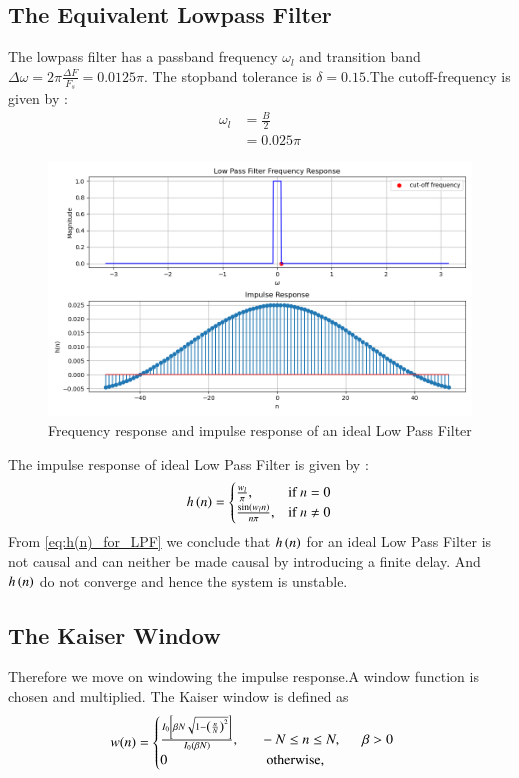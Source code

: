 \documentclass{article}
\begin{document}
\subsection{The Equivalent Lowpass Filter}
The lowpass filter has a passband frequency $\omega_l$ and transition band $\Delta \omega = 2\pi \frac{\Delta F}{F_s} = 0.0125\pi$.
The stopband tolerance is $\delta=0.15$.The cutoff-frequency is given by :
\begin{align}
    \omega_{l} &= \frac{B}{2}\\
                &= 0.025\pi
\end{align}
\begin{figure}[H]
\centering
\includegraphics[width=1\columnwidth]{figs/LPF_FIR.png}
\caption{Frequency response and impulse response of an ideal Low Pass Filter}
\label{fig:LPF_FIR_1}
\end{figure}

The impulse response of ideal Low Pass Filter is given by :
\begin{align}
    h\left(n\right) = 
\begin{cases} 
    \frac{w_l}{\pi}, & \text{if } n = 0 \\
    \frac{\sin(w_l n)}{n\pi}, & \text{if } n \neq 0
\end{cases} \label{eq:h(n)_for_LPF}
\end{align}
From \eqref{eq:h(n)_for_LPF} we conclude that $h\left(n\right)$ for an ideal Low Pass Filter is not causal and can neither be made causal by introducing a finite delay. And $h\left(n\right)$ do not converge and hence the system is unstable.
\subsection{The Kaiser Window}
Therefore we move on windowing the impulse response.A window function is chosen and multiplied. The Kaiser window is defined as
\begin{align}
    w(n) =
    \begin{cases}
    \frac{I_0\left[ \beta N \sqrt{1 - \left(\frac{n}{N}\right)^2} \right]}{I_0(\beta N)},
\indent -N \leq n \leq N, \indent \beta > 0 \nonumber \\
 0 \hspace{2.5 cm} \mbox{otherwise,}
 \end{cases}
\end{align}
\end{document}
